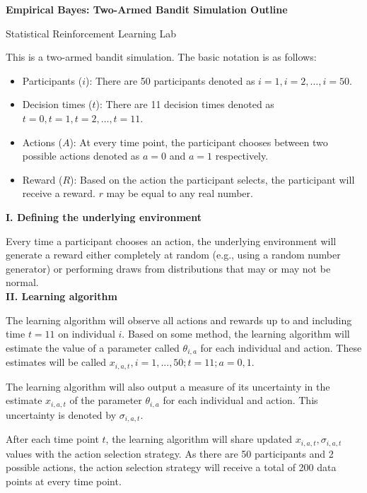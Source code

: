 \documentclass[letterpaper, 11pt]{extarticle}
\begin{document}
\begin{Large}
    \textsf{\textbf{Empirical Bayes: Two-Armed Bandit Simulation Outline}}   \par
    Statistical Reinforcement Learning Lab
\end{Large}

\vspace{2ex}

This is a two-armed bandit simulation. The basic notation is as follows: 
\begin{itemize}
    \item Participants ($i$): There are 50 participants denoted as $i=1, i=2, \dots, i=50$.
    \item Decision times ($t$): There are 11 decision times denoted as $t=0, t=1, t=2,\dots,t=11$. 
    \item Actions ($A$): At every time point, the participant chooses between two possible actions denoted as $a=0$ and $a=1$ respectively. 
    \item Reward ($R$): Based on the action the participant selects, the participant will receive a reward. $r$ may be equal to any real number. 
\end{itemize}

\textsf{\textbf {I. Defining the underlying environment}}

Every time a participant chooses an action, the underlying environment will generate a reward either completely at random (e.g., using a random number generator) or performing draws from distributions that may or may not be normal. \\

\textsf{\textbf {II. Learning algorithm}}

The learning algorithm will observe all  actions and rewards  up to and including time $t=11$ on individual $i$. Based on some method, the learning algorithm will estimate the value of a parameter called $\theta_{i,a}$ for each individual and action. These estimates will be called $x_{i,a,t}, i=1,...,50; t=11; a=0,1$.

The learning algorithm will also output a measure of its uncertainty in the estimate $x_{i,a,t}$ of the parameter $\theta_{i,a}$ for each individual and action.  This uncertainty is denoted by $\sigma_{i,a,t}$.

After each time point $t$, the learning algorithm will share updated $x_{i,a,t}, \sigma_{i,a,t}$ values with the action selection strategy. As there are 50 participants and 2 possible actions, the action selection strategy will receive a total of 200 data points at every time point.  \\
\end{document}
